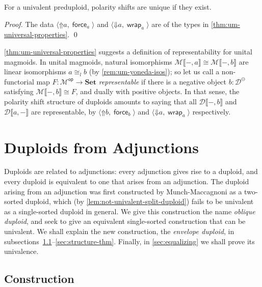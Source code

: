 \documentclass[runningheads]{llncs}
\newcommand*\rocqlogo{\usebox{\rocqlogobox}}
\newcommand{\lemmaref}[3]{\href{https://github.com/UniMath/UniMath/blob/94fae0eda57a778cec704bfa73b4ff525c9bc475/#1\#L#2?name=#3}{\rocqlogo}}
\newcommand{\acat}[1]{\mathcal{#1}}
\newcommand{\D}{\acat{D}}
\newcommand{\M}{\acat{M}}
\newcommand{\Cl}[1]{#1_l}
\newcommand{\Cn}[1]{#1^\ominus}
\newcommand{\wkcat}[1]{\mathbf{#1}}
\newcommand{\Setcat}{\wkcat{Set}}
\newcommand{\op}{{\mathsf{op}}}
\newcommand{\morsof}[3]{{#1}\llbracket{#2},{#3}\rrbracket}
\newcommand{\force}{\mathop{\mathsf{force}}\nolimits}
\newcommand{\wrap}{\mathop{\mathsf{wrap}}\nolimits}
\newcommand{\upshift}{\mathord{\Uparrow}}
\newcommand{\downshift}{\mathord{\Downarrow}}
\begin{document}
\begin{theorem}[{\lemmaref{UniMath/CategoryTheory/Nonassociative/Duploids/Univalence.v}{390}{isaprop\_has\_polarity\_shifts}}]
\label{thm:isaprop-shifts}
For a univalent preduploid, polarity shifts are unique if they exist.
\end{theorem}
\begin{proof}
The data \(\langle \upshift{a}, \force_a \rangle\) and \(\langle
\downshift{a}, \wrap_a \rangle\) are of the types in
\autoref{thm:um-universal-properties}.
\qed
\end{proof}

\begin{remark}
\label{rem:um-representability}
\autoref{thm:um-universal-properties} suggests a definition of representability
for unital magmoids. In unital magmoids, natural isomorphisms
\(\morsof\M{-}{a} \cong \morsof\M{-}{b}\) are linear isomorphisms \(a
\Cl\cong b\) (by \autoref{rem:um-yoneda-isos}); so let us call a non\hyp{}functorial map
\(F : \M^\op \to \Setcat\) \emph{representable} if there is a negative
object \(b : \Cn\D\) satisfying \(\morsof\M{-}{b} \cong F\), and
dually with positive objects. In that sense, the polarity shift
structure of duploids amounts to saying that all \(\morsof\D{-}{b}\)
and \(\morsof\D{a}{-}\) are representable, by \(\langle \upshift{b},
\force_b \rangle\) and \(\langle \downshift{a}, \wrap_a \rangle\)
respectively.
\end{remark}
\section{Duploids from Adjunctions}
\label{sec:from-adjunctions}
\label{sec:lastbody}
Duploids are related to adjunctions: every adjunction gives rise to a
duploid, and every duploid is equivalent to one that arises from an
adjunction. The duploid arising from an adjunction was first
constructed by Munch\hyp{}Maccagnoni \cite{MunchMaccagnoni14} as a
two\hyp{}sorted duploid, which (by \autoref{lem:not-univalent-split-duploid}) fails
to be univalent as a single\hyp{}sorted duploid in general. We give this
construction the name \emph{oblique duploid}, and seek to give an
equivalent single\hyp{}sorted construction that can be univalent. We shall
explain the new construction, the \emph{envelope duploid}, in
subsections~\ref{sec:construction}--\ref{sec:structure-thm}. Finally,
in \autoref{sec:equalizing} we shall prove its univalence.
\subsection{Construction}
\label{sec:construction}
\end{document}
